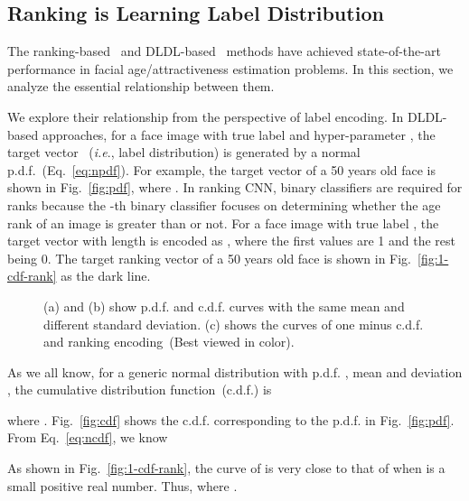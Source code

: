 \documentclass[5p,times,twocolumn]{elsarticle}
\makeatletter
\DeclareRobustCommand\onedot{\@onedot}
\def\@onedot{.}
\def\ie{\emph{i.e}\onedot}
\makeatother
\begin{document}
\subsection{Ranking is Learning Label Distribution}\label{subsec:rem}
The ranking-based~\cite{niu2016ordinal,chen2017using,Chen2017Deep} and DLDL-based~\cite{gao2017deep,shen2017deep,shen2017label,fan2017label} methods have achieved state-of-the-art performance in facial age/attractiveness estimation problems. In this section, we analyze the essential relationship between them. 

We explore their relationship from the perspective of label encoding. In DLDL-based approaches, for a face image  with true label  and hyper-parameter , the target vector ~(\ie, label distribution) is generated by a normal p.d.f.~(Eq.~\eqref{eq:npdf}). For example, the target vector of a 50 years old face is shown in Fig.~\ref{fig:pdf}, where . In ranking CNN,  binary classifiers are required for  ranks because the -th binary classifier focuses on determining whether the age rank of an image is greater than  or not. For a face image  with true label , the target vector with length  is encoded as , where the first  values are 1 and the rest being 0. The target ranking vector of a 50 years old face is shown in Fig.~\ref{fig:1-cdf-rank} as the dark line. 

\begin{figure}[t]
 \centering
\caption{(a) and (b) show p.d.f. and c.d.f. curves with the same mean and different standard deviation. (c) shows the curves of one minus c.d.f. and ranking encoding~(Best viewed in color).} \label{fig:pdf-cdf}
\vspace{-10pt}
\end{figure}

As we all know, for a generic normal distribution with p.d.f. , mean  and deviation , the cumulative distribution function~(c.d.f.) is

where . 
Fig.~\ref{fig:cdf} shows the c.d.f. corresponding to the p.d.f. in Fig.~\ref{fig:pdf}. From Eq.~\eqref{eq:ncdf}, we know

As shown in Fig.~\ref{fig:1-cdf-rank}, the curve of  is very close to that of  when  is a small positive real number. Thus, 
where . 
\end{document}
